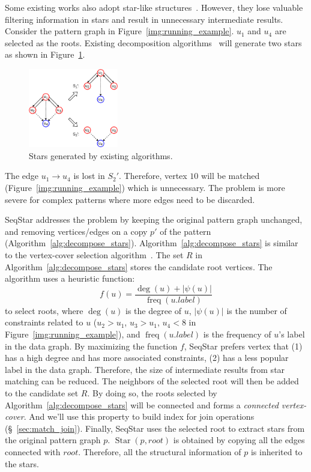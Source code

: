 
Some existing works also adopt star-like structures~\cite{DBLP:journals/pvldb/SunWWSL12,DBLP:journals/pvldb/LaiQLC15}. However, they lose valuable filtering information in stars and result in unnecessary intermediate results.
Consider the pattern graph in Figure~\ref{img:running_example}. $u_1$ and $u_4$ are selected as the roots.
Existing decomposition algorithms~\cite{DBLP:journals/pvldb/SunWWSL12,DBLP:journals/pvldb/LaiQLC15} will generate two stars as shown in Figure~\ref{img:stwig}.
\begin{figure}[ht]
  \centering
  \includegraphics[width=0.35\textwidth]{img/stwig.pdf}
  \caption{Stars generated by existing algorithms.}\label{img:stwig}
\end{figure}
The edge $u_1 \rightarrow u_4$ is lost in $S_2'$.
Therefore, vertex $10$ will be matched (Figure~\ref{img:running_example}) which is unnecessary.
The problem is more severe for complex patterns where more edges need to be discarded.

SeqStar addresses the problem by keeping the original pattern graph unchanged, and removing vertices/edges on a copy $p'$ of the pattern (Algorithm~\ref{alg:decompose_stars}).
Algorithm~\ref{alg:decompose_stars} is similar to the vertex-cover selection algorithm~\cite{DBLP:books/daglib/0023376}.
The set $R$ in Algorithm~\ref{alg:decompose_stars} stores the candidate root vertices.
The algorithm uses a heuristic function: \[f(u) = \frac{\deg(u) + |\psi(u)|}{\operatorname{freq}(u.label)}\] to select roots,
where $\deg(u)$ is the degree of $u$, $|\psi(u)|$ is the number of constraints related to $u$ ($u_2 > u_1$, $u_3 > u_1$, $u_4 < 8$ in Figure~\ref{img:running_example}),
and $\operatorname{freq}(u.label)$ is the frequency of $u$'s label in the data graph.
By maximizing the function $f$,
SeqStar prefers vertex that
(1) has a high degree and has more associated constraints,
(2) has a less popular label in the data graph.
Therefore, the size of intermediate results from star matching can be reduced.
The neighbors of the selected root will then be added to the candidate set $R$.
By doing so, the roots selected by Algorithm~\ref{alg:decompose_stars} will be connected and forms a \emph{connected vertex-cover}.
And we'll use this property to build index for join operations (\S~\ref{sec:match_join}).
Finally, SeqStar uses the selected root to extract stars from the original pattern graph $p$.
$\operatorname{Star}(p, root)$ is obtained by copying all the edges connected with $root$.
Therefore, all the structural information of $p$ is inherited to the stars.

